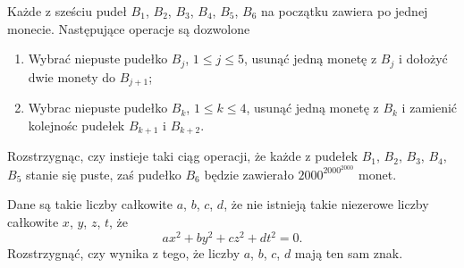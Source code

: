 



\noindent
Każde z sześciu pudeł $B_1$, $B_2$, $B_3$, $B_4$, $B_5$, $B_6$ na początku zawiera po jednej monecie. Następujące operacje są dozwolone

\begin{enumerate}
	\item Wybrać niepuste pudełko $B_j$, $1\leq j \leq 5$, usunąć jedną monetę z $B_j$ i dołożyć dwie monety do $B_{j+1}$;

	\item  Wybrac niepuste pudełko $B_k$, $1\leq k \leq 4$, usunąć jedną monetę z $B_k$ i zamienić kolejnośc pudełek $B_{k+1}$ i $B_{k+2}$.

\end{enumerate}

\noindent
Rozstrzygnąc, czy instieje taki ciąg operacji, że każde z pudełek $B_1$, $B_2$, $B_3$, $B_4$, $B_5$ stanie się puste, zaś pudełko $B_6$ będzie zawierało $2000^{2000^{2000}}$ monet.




\noindent
Dane są takie liczby całkowite $a$, $b$, $c$, $d$, że nie istnieją takie niezerowe liczby całkowite $x$, $y$, $z$, $t$, że
\[
	ax^2 + by^2 + cz^2 + dt^2 = 0.
\]
Rozstrzygnąć, czy wynika z tego, że liczby $a$, $b$, $c$, $d$ mają ten sam znak.



